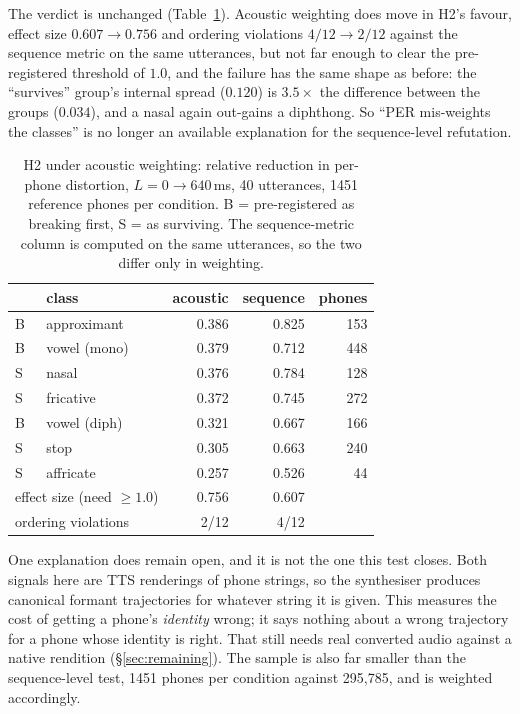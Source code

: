 \documentclass[9pt,a4paper,twocolumn]{article}
\begin{document}
The verdict is unchanged (Table~\ref{tab:h2audio}). Acoustic weighting does move
in H2's favour, effect size $0.607 \rightarrow 0.756$ and ordering violations
$4/12 \rightarrow 2/12$ against the sequence metric on the same utterances,
but not far enough to clear the pre-registered threshold of $1.0$, and the
failure has the same shape as before: the ``survives'' group's internal spread
($0.120$) is $3.5\times$ the difference between the groups ($0.034$), and a
nasal again out-gains a diphthong. So ``PER mis-weights the classes'' is no
longer an available explanation for the sequence-level refutation.

\begin{table}[t]
\centering\small
\caption{H2 under acoustic weighting: relative reduction in per-phone
distortion, $L{=}0\rightarrow640$\,ms, 40 utterances, 1451 reference phones per
condition. B = pre-registered as breaking first, S = as surviving. The
sequence-metric column is computed on the same utterances, so the two differ
only in weighting.}
\label{tab:h2audio}
\begin{tabular}{llrrr}
\toprule
& class & acoustic & sequence & phones \\
\midrule
B & approximant  & 0.386 & 0.825 & 153 \\
B & vowel (mono) & 0.379 & 0.712 & 448 \\
S & nasal        & 0.376 & 0.784 & 128 \\
S & fricative    & 0.372 & 0.745 & 272 \\
B & vowel (diph) & 0.321 & 0.667 & 166 \\
S & stop         & 0.305 & 0.663 & 240 \\
S & affricate    & 0.257 & 0.526 & 44 \\
\midrule
\multicolumn{2}{l}{effect size (need $\geq1.0$)} & 0.756 & 0.607 & \\
\multicolumn{2}{l}{ordering violations} & 2/12 & 4/12 & \\
\bottomrule
\end{tabular}
\end{table}

One explanation does remain open, and it is not the one this test closes. Both
signals here are TTS renderings of phone strings, so the synthesiser produces
canonical formant trajectories for whatever string it is given. This measures
the cost of getting a phone's \emph{identity} wrong; it says nothing about a
wrong trajectory for a phone whose identity is right. That still needs real
converted audio against a native rendition (\S\ref{sec:remaining}). The sample
is also far smaller than the sequence-level test, 1451 phones per condition
against 295{,}785, and is weighted accordingly.
\end{document}
